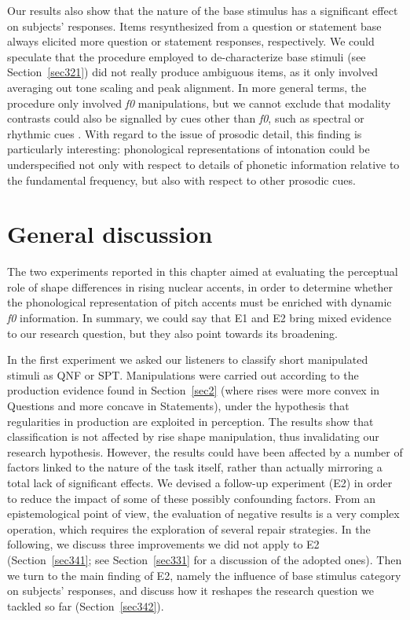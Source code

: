 Our results also show that the nature of the base stimulus has a significant effect on subjects' responses. Items resynthesized from a question or statement base always elicited more question or statement responses, respectively. We could speculate that the procedure employed to de-characterize base stimuli (see Section~\ref{sec321}) did not really produce ambiguous items, as it only involved averaging out tone scaling and peak alignment. In more general terms, the procedure only involved \textit{f0} manipulations, but we cannot exclude that modality contrasts could also be signalled by cues other than \textit{f0}, such as spectral or rhythmic cues \citep[§5, among others]{niebuhr2010pitchaccent,dimperio2000role}. With regard to the issue of prosodic detail, this finding is particularly interesting: phonological representations of intonation could be underspecified not only with respect to details of phonetic information relative to the fundamental frequency, but also with respect to other prosodic cues.

\section{General discussion}\label{sec34}
The two experiments reported in this chapter aimed at evaluating the perceptual role of shape differences in rising nuclear accents, in order to determine whether the phonological representation of pitch accents must be enriched with dynamic \textit{f0} information. In summary, we could say that E1 and E2 bring mixed evidence to our research question, but they also point towards its broadening. 

In the first experiment we asked our listeners to classify short manipulated stimuli as QNF or SPT. Manipulations were carried out according to the production evidence found in Section~\ref{sec2} (where rises were more convex in Questions and more concave in Statements), under the hypothesis that regularities in production are exploited in perception. The results show that classification is not affected by rise shape manipulation, thus invalidating our research hypothesis. However, the results could have been affected by a number of factors linked to the nature of the task itself, rather than actually mirroring a total lack of significant effects. We devised a follow-up experiment (E2) in order to reduce the impact of some of these possibly confounding factors. From an epistemological point of view, the evaluation of negative results is a very complex operation, which requires the exploration of several repair strategies. In the following, we discuss three improvements we did not apply to E2 (Section~\ref{sec341}; see Section~\ref{sec331} for a discussion of the adopted ones). Then we turn to the main finding of E2, namely the influence of base stimulus category on subjects' responses, and discuss how it reshapes the research question we tackled so far (Section~\ref{sec342}).

